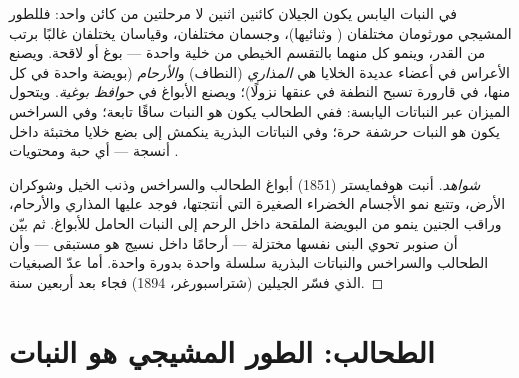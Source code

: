 \begin{proposition}\label{prop:b2:plant-life-cycles:alternation}
في النبات اليابس يكون الجيلان كائنين اثنين لا مرحلتين من كائن واحد:
فللطور المشيجي  مورثومان مختلفان ( وثنائيها)،
وجسمان مختلفان، وقياسان يختلفان غالبًا برتب من القدر، وينمو كل
منهما بالتقسم الخيطي من خلية واحدة --- بوغ أو لاقحة. ويصنع  الأعراس في أعضاء عديدة الخلايا هي \emph{المذاري} (النطاف)
و\emph{الأرحام} (بويضة واحدة في كل منها، في قارورة تسبح النطفة في
عنقها نزولًا)؛ ويصنع  الأبواغ في \emph{حوافظ بوغية}.
ويتحول الميزان عبر النباتات اليابسة: ففي الطحالب يكون 
هو النبات  ساقًا تابعة؛ وفي السراخس يكون 
هو النبات  حرشفة حرة؛ وفي النباتات البذرية ينكمش  إلى بضع خلايا مختبئة داخل أنسجة  --- أي حبة
 ومحتويات .
\end{proposition}
\begin{proof}[شواهد]
أنبت هوفمايستر (1851) أبواغ الطحالب والسراخس وذنب الخيل وشوكران
الأرض، وتتبع نمو الأجسام الخضراء الصغيرة التي أنتجتها، فوجد عليها
المذاري والأرحام، وراقب الجنين ينمو من البويضة الملقحة داخل الرحم
إلى النبات الحامل للأبواغ. ثم بيّن أن  صنوبر تحوي البنى نفسها
مختزلة --- أرحامًا داخل نسيج هو  مستبقى --- وأن الطحالب
والسراخس والنباتات البذرية سلسلة واحدة بدورة واحدة. أما عدّ
الصبغيات الذي فسّر الجيلين (شتراسبورغر، 1894) فجاء بعد أربعين سنة.
\end{proof}

\section{الطحالب: الطور المشيجي هو النبات}

